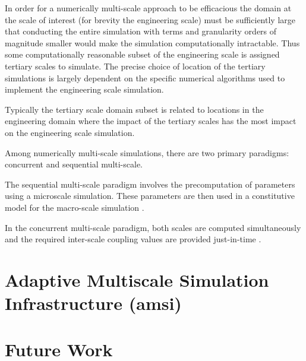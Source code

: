\documentclass[11pt]{article}
\begin{document}
In order for a numerically multi-scale approach to be efficacious the domain at the scale of interest (for brevity the engineering scale) must be sufficiently large that conducting the entire simulation with terms and granularity orders of magnitude smaller would make the simulation computationally intractable. Thus some computationally reasonable subset of the engineering scale is assigned tertiary scales to simulate. The precise choice of location of the tertiary simulations is largely dependent on the specific numerical algorithms used to implement the engineering scale simulation. 

Typically the tertiary scale domain subset is related to locations in the engineering domain where the impact of the tertiary scales has the most impact on the engineering scale simulation. 

\label{multiscale_paradigms}
Among numerically multi-scale simulations, there are two primary paradigms: concurrent and sequential multi-scale. 

The sequential multi-scale paradigm involves the precomputation of parameters using a microscale simulation. These parameters are then used in a constitutive model for the macro-scale simulation \cite{garcia2008sequential}.

In the concurrent multi-scale paradigm, both scales are computed simultaneously and the required inter-scale coupling values are provided just-in-time \cite{zeng2010concurrent}.

\section{Adaptive Multiscale Simulation Infrastructure (amsi)}\label{amsi}

\section{Future Work}\label{future_work}


\end{document}
